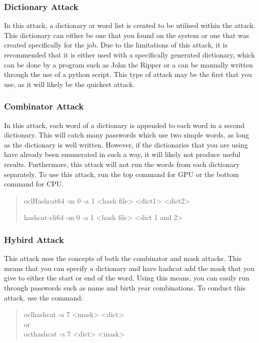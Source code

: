 \documentclass[a4paper,11pt]{report}
\begin{document}
			\subsubsection{Dictionary Attack}
				In this attack, a dictionary or word list is created to be utilised within the attack. 
				This dictionary can either be one that you found on the system or one that was created specifically for the job. 
				Due to the limitations of this attack, it is recommended that it is either used with a specifically generated dictionary, which can be done by a program such as John the Ripper or
				a can be manually written through the use of a python script. 
				This type of attack may be the first that you use, as it will likely be the quickest attack. 
			\subsubsection{Combinator Attack}
				In this attack, each word of a dictionary is appended to each word in a second dictionary. 
				This will catch many passwords which use two simple words, as long as the dictionary is well written. 
				However, if the dictionaries that you are using have already been enumerated in such a way, it will likely not produce useful results. 
				Furthermore, this attack will not run the words from each dictionary separately. 
				To use this attack, run the top command for GPU or the bottom command for CPU. 
				\begin{quote}
					oclHashcat64 -m 0 -a 1 <hash file> <dict1> <dict2>
					
					hashcat-cli64 -m 0 -a 1 <hash file> <dict 1 and 2>
				\end{quote}
			\subsubsection{Hybird Attack}
				This attack uses the concepts of both the combinator and mask attacks. 
				This means that you can specify a dictionary and have hashcat add the mask that you give to either the start or end of the word. 
				Using this means, you can easily run through passwords such as name and birth year combinations. 
				To conduct this attack, use the command:
				\begin{quote}
					oclhashcat -a 7 <mask> <dict>
					\\or\\
					octhashcat -a 7 <dict> <mask>
				\end{quote}
				
\end{document}
